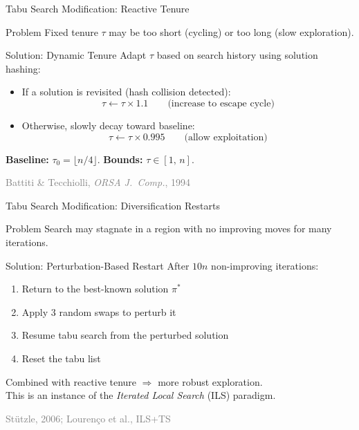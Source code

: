 \documentclass[aspectratio=169,11pt]{beamer}
\newcommand{\reference}[1]{\hfill{\scriptsize\textcolor{gray}{#1}}}
\begin{document}
\begin{frame}{Tabu Search Modification: Reactive Tenure}
\begin{alertblock}{Problem}
Fixed tenure $\tau$ may be \alert{too short} (cycling) or \alert{too long} (slow exploration).
\end{alertblock}
\vspace{4pt}
\begin{block}{Solution: Dynamic Tenure}
Adapt $\tau$ based on search history using solution hashing:
\begin{itemize}
  \item If a solution is \alert{revisited} (hash collision detected):
        \[\tau \leftarrow \tau \times 1.1 \qquad\text{(increase to escape cycle)}\]
  \item Otherwise, slowly decay toward baseline:
        \[\tau \leftarrow \tau \times 0.995 \qquad\text{(allow exploitation)}\]
\end{itemize}
\end{block}
\vspace{2pt}
\textbf{Baseline:} $\tau_0 = \lfloor n/4\rfloor$.\quad
\textbf{Bounds:} $\tau\in[1,\,n]$.

\reference{Battiti \& Tecchiolli, \emph{ORSA J.\ Comp.}, 1994}
\end{frame}

\begin{frame}{Tabu Search Modification: Diversification Restarts}
\begin{alertblock}{Problem}
Search may \alert{stagnate} in a region with no improving moves for many iterations.
\end{alertblock}
\vspace{4pt}
\begin{block}{Solution: Perturbation-Based Restart}
After $10n$ non-improving iterations:
\begin{enumerate}
  \item Return to the best-known solution $\pi^*$
  \item Apply 3 random swaps to perturb it
  \item Resume tabu search from the perturbed solution
  \item Reset the tabu list
\end{enumerate}
\end{block}
\vspace{4pt}
Combined with reactive tenure $\Rightarrow$ more \alert{robust exploration}.\\
This is an instance of the \emph{Iterated Local Search} (ILS) paradigm.

\reference{St\"utzle, 2006; Louren\c{c}o et al., ILS+TS}
\end{frame}
\end{document}
